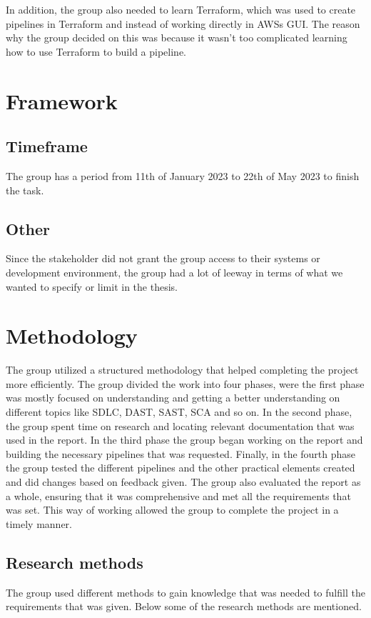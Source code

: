 In addition, the group also needed to learn Terraform, which was used to create pipelines in Terraform and instead of working directly in AWSs \gls{GUI}. The reason why the group decided on this was because it wasn't too complicated learning how to use Terraform to build a pipeline. 





\section{Framework}

\subsection{Timeframe}
The group has a period from 11th of January 2023 to 22th of May 2023 to finish the task. 

\subsection{Other}
Since the stakeholder did not grant the group access to their systems or development environment, the group had a lot of leeway in terms of what we wanted to specify or limit in the thesis.



\section{Methodology} %
The group utilized a structured methodology that helped completing the project more efficiently. The group divided the work into four phases, were the first phase was mostly focused on understanding and getting a better understanding on different topics like SDLC, DAST, SAST, SCA and so on. In the second phase, the group spent time on research and locating relevant documentation that was used in the report. In the third phase the group began working on the report and building the necessary pipelines that was requested. Finally, in the fourth phase the group tested the different pipelines and the other practical elements created and did changes based on feedback given. The group also evaluated the report as a whole, ensuring that it was comprehensive and met all the requirements that was set. This way of working allowed the group to complete the project in a timely manner. 
\newpage
\subsection{Research methods}
The group used different methods to gain knowledge that was needed to fulfill the requirements that was given. Below some of the research methods are mentioned. 

